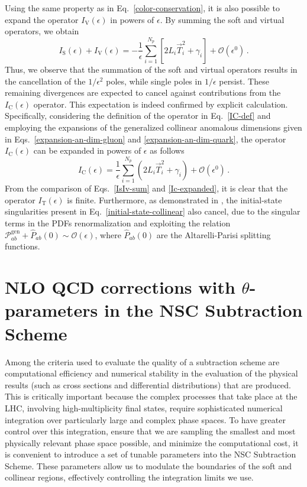 \documentclass[a4paper, 12pt]{book}
\begin{document}
Using the same property as in Eq.~\ref{color-conservation}, it is also possible to expand the operator $I_{\mathrm{V}}(\epsilon)$ in powers of $\epsilon$. By summing the soft and virtual operators, we obtain
\begin{equation}
  I_{\mathrm{S}}(\epsilon)+I_{\mathrm{V}}(\epsilon)= - \frac{1}{\epsilon} \sum_{i=1}^{N_p} \left[2 L_i \vec{T}_i^2 + \gamma _i\right] + \mathcal{O}(\epsilon^0)\, .
  \label{IsIv-sum}
\end{equation}
Thus, we observe that the summation of the soft and virtual operators results in the cancellation of the $1/\epsilon^2$ poles, while single poles in $1/\epsilon$ persist. These remaining divergences are expected to cancel against contributions from the $I_{\mathrm{C}}(\epsilon)$ operator. This expectation is indeed confirmed by explicit calculation. Specifically, considering the definition of the operator in Eq.~\ref{IC-def} and employing the expansions of the generalized collinear anomalous dimensions given in Eqs.~\ref{expansion-an-dim-gluon} and \ref{expansion-an-dim-quark}, the operator $I_{\mathrm{C}}(\epsilon)$ can be expanded in powers of $\epsilon$ as follows
\begin{equation}
  I_{\mathrm{C}}(\epsilon)= \frac{1}{\epsilon}\sum_{i=1}^{N_p} \left( 2 L_i \vec{T}_i^2 + \gamma _i \right) + \mathcal{O}(\epsilon^0)\, .
  \label{Ic-expanded}
\end{equation}
From the comparison of Eqs.~\ref{IsIv-sum} and \ref{Ic-expanded}, it is clear that the operator $I_{\mathrm{T}}(\epsilon)$ is finite. Furthermore, as demonstrated in \cite{Devoto:2025kin}, the initial-state singularities present in Eq.~\ref{initial-state-collinear} also cancel, due to the singular terms in the PDFs renormalization and exploiting the relation $\mathcal{P}_{ab}^{\mathrm{gen}}+\hat{P}_{ab}(0) \sim \mathcal{O}(\epsilon)$, where $\hat{P}_{ab}(0)$ are the Altarelli-Parisi splitting functions.

\clearpage

\chapter{NLO QCD corrections with $\theta$-parameters in the NSC Subtraction Scheme}
\label{NSC-SS-parameters}
Among the criteria used to evaluate the quality of a subtraction scheme are computational efficiency and numerical stability in the evaluation of the physical results (such as cross sections and differential distributions) that are produced. This is critically important because the complex processes that take place at the LHC, involving high-multiplicity final states, require sophisticated numerical integration over particularly large and complex phase spaces. To have greater control over this integration, ensure that we are sampling the smallest and most physically relevant phase space possible, and minimize the computational cost, it is convenient to introduce a set of tunable parameters into the NSC Subtraction Scheme. These parameters allow us to modulate the boundaries of the soft and collinear regions, effectively controlling the integration limits we use.
\end{document}
